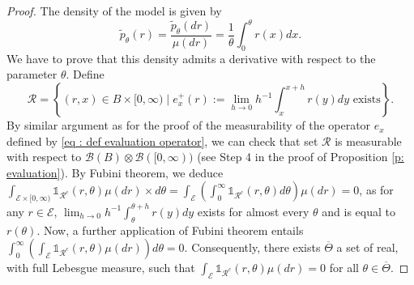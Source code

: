 \documentclass[10pt,a4paper]{amsart}
\newcommand{\cB}{{\mathcal{B}}}
\newcommand{\cE}{{\mathcal{E}}}
\newcommand{\cR}{{\mathcal{R}}}
\newcommand{\indi}[1]{\mathds{1}_{#1}}
\begin{document}
\begin{proof}
	The density of the model is given by 
	\begin{equation}
		\label{eq : tilde p unif}
		\tilde{p}_\theta(r) =\frac{\tilde{p}_\theta(dr)}{\mu(dr)}=\frac{1}{\theta} \int_0^\theta r(x)dx.
	\end{equation}
		 We have to prove that this density admits a derivative with respect to the parameter $\theta$. Define 
	\begin{equation*}
		\cR=\left\{(r,x)\in B \times [0,\infty) \mid e_x^+(r):=\lim_{h\to0} h^{-1}\int_x^{x+h} r(y) dy \text{ exists} \right\}.
	\end{equation*}
	By similar argument as for the proof of the measurability of the operator $e_x$ defined by \eqref{eq : def evaluation operator}, we can check that set $\cR$ is measurable with respect to $\cB(B)\otimes\cB([0,\infty))$ (see Step 4 in the proof of Proposition \ref{p: evaluation}). By Fubini theorem, we deduce
	$\int_{\cE \times [0,\infty)} \indi{\cR^c}(r,\theta) \mu(dr)\times d\theta=
\int_{\cE} \left(\int_0^\infty \indi{\cR^c}(r,\theta) d\theta \right)\mu(dr)=0$, as for any $r\in \cE$, $\lim_{h\to0} h^{-1}\int_\theta^{\theta+h} r(y) dy$ exists for almost every $\theta$ and is equal to $r(\theta)$. Now, a further application of Fubini theorem entails  
$ \int_0^\infty\left(\int_{\cE} \indi{\cR^c}(r,\theta) \mu(dr) \right)d\theta=0$.
 Consequently, there exists $\overline{\Theta}$ a set of real, with full Lebesgue
  measure, such that $\int_{\cE} \indi{\cR^c}(r,\theta) \mu(dr)=0$ for all $\theta \in \overline{\Theta}$.


\end{proof}
\end{document}
